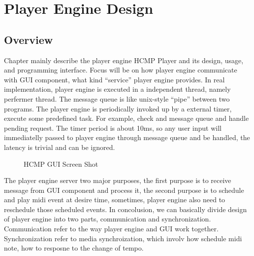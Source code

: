 
\chapter{Player Engine Design} %



\ifpdf
    \graphicspath{{X/figures/PNG/}{X/figures/PDF/}{X/figures/}}
\else
    \graphicspath{{X/figures/EPS/}{X/figures/}}
\fi

\section{Overview}
Chapter mainly describe the player engine HCMP Player and its design, usage,
and programming interface. Focus will be on how player engine communicate 
with GUI component, what kind  
``service'' player engine provides. In real implementation, player engine is 
executed in a independent thread, namely perfermer thread. The message queue 
is like unix-style ``pipe'' between 
two programs. The player engine is periodically invoked up by a external timer, 
execute some predefined task. For example, check and message queue and handle 
pending request. The timer period is about 10ms, so any user 
input will immediatelly passed to player engine through message queue and 
be handled, the latency is trivial and can be ignored.

\begin{figure}[H]
\caption{HCMP GUI Screen Shot}
\label{fig:speciation}
\end{figure}

The player engine server two major purposes, the first purpose is to receive 
message from GUI component and process it, the second purpose is to schedule 
and play midi event at desire time, sometimes, player engine also need to 
reschedule those scheduled events. In concolusion, we can basically divide 
design of player engine  
into two parts, communication and synchronization. Communication refer to the 
way player engine and GUI work together. Synchronization refer to
media synchroization, which involv how schedule midi note, how to resposne to
the change of tempo. 

